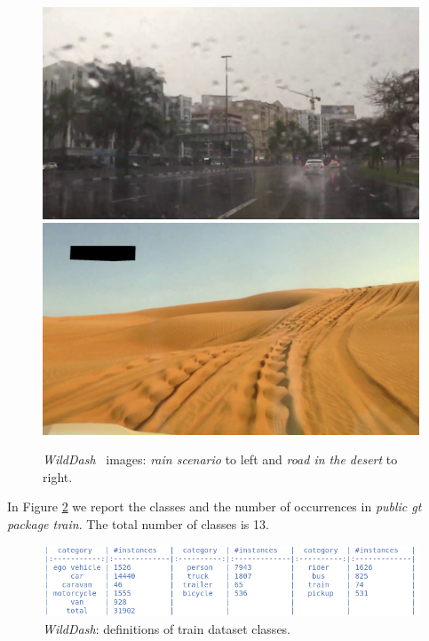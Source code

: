 \documentclass[10pt,twocolumn,letterpaper]{article}
\begin{document}
\begin{figure}[H]
\centering
\includegraphics[width=0.4\linewidth]{./image/wd_rain.jpg} \quad \includegraphics[width=0.4\linewidth]{./image/wd_desert.jpg}
\caption{\textit{WildDash}~\cite{wildDash} images: \textit{rain scenario} to left and \textit{road in the desert} to right.}
 \label{fig:image_wd}
\noindent
\end{figure}
In Figure \ref{fig:class_definitions_wd} we report the classes and the number of occurrences in \textit{public gt package train}. The total number of classes is 13.
\begin{figure}[H]
\centering
  \includegraphics[width=0.95\linewidth]{./image/wd_class.png} 
  \caption{\textit{WildDash}: definitions of train dataset classes.} %
  \label{fig:class_definitions_wd}
\noindent
\end{figure}
\end{document}
